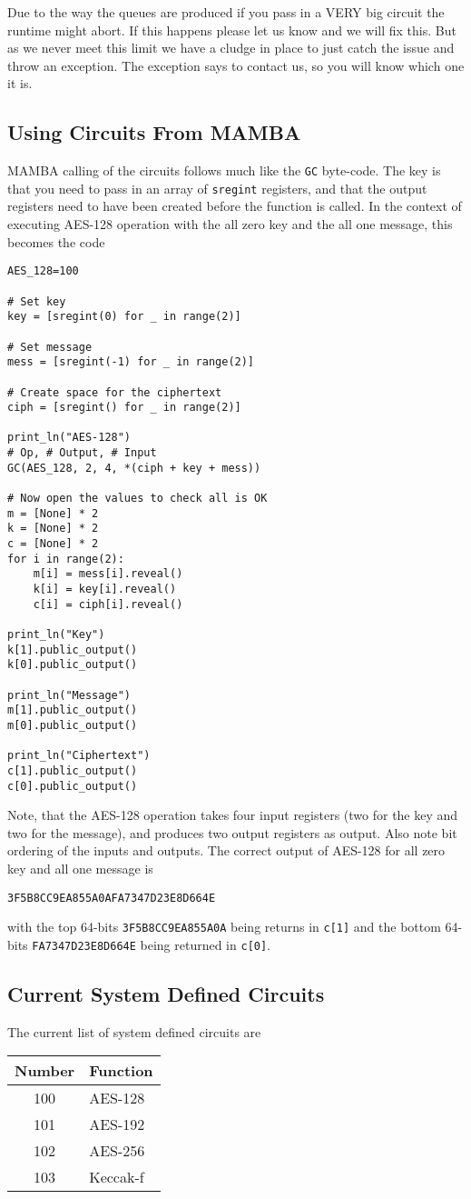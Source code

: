 Due to the way the queues are produced if you pass in a
VERY big circuit the  runtime might abort. If this happens
please let us know and we will fix this. But as we never
meet this limit we have a cludge in place to just catch
the issue and throw an exception. The exception says
to contact us, so you will know which one it is.

\subsection{Using Circuits From MAMBA}
MAMBA calling of the circuits follows much like the
\verb|GC| byte-code. The key is that you need to
pass in an array of \verb|sregint| registers, and that
the output registers need to have been created before
the function is called.
In the context of executing AES-128 operation with
the all zero key and the all one message, this becomes
the code
\begin{lstlisting}
AES_128=100

# Set key
key = [sregint(0) for _ in range(2)]

# Set message
mess = [sregint(-1) for _ in range(2)]

# Create space for the ciphertext
ciph = [sregint() for _ in range(2)]

print_ln("AES-128")
# Op, # Output, # Input
GC(AES_128, 2, 4, *(ciph + key + mess))

# Now open the values to check all is OK
m = [None] * 2
k = [None] * 2
c = [None] * 2
for i in range(2):
	m[i] = mess[i].reveal()
	k[i] = key[i].reveal()
	c[i] = ciph[i].reveal()

print_ln("Key")
k[1].public_output()     
k[0].public_output()

print_ln("Message")
m[1].public_output()     
m[0].public_output()

print_ln("Ciphertext")
c[1].public_output()     
c[0].public_output()
\end{lstlisting}
Note, that the AES-128 operation takes four
input registers (two for the key and two for
the message), and produces two output registers
as output.
Also note bit ordering of the inputs and outputs.
The correct output of AES-128 for all zero key
and all one message is
\begin{center}
  \verb|3F5B8CC9EA855A0AFA7347D23E8D664E|
\end{center}
with the top 64-bits \verb|3F5B8CC9EA855A0A|
being returns in \verb|c[1]| and the bottom
64-bits \verb|FA7347D23E8D664E| being returned
in \verb|c[0]|.


\subsection{Current System Defined Circuits}
The current list of system defined circuits are
\begin{center}
\begin{tabular}{c|l}
Number & Function \\
\hline
100 & AES-128 \\
101 & AES-192 \\
102 & AES-256 \\
103 & Keccak-f \\
\end{tabular}
\end{center}

